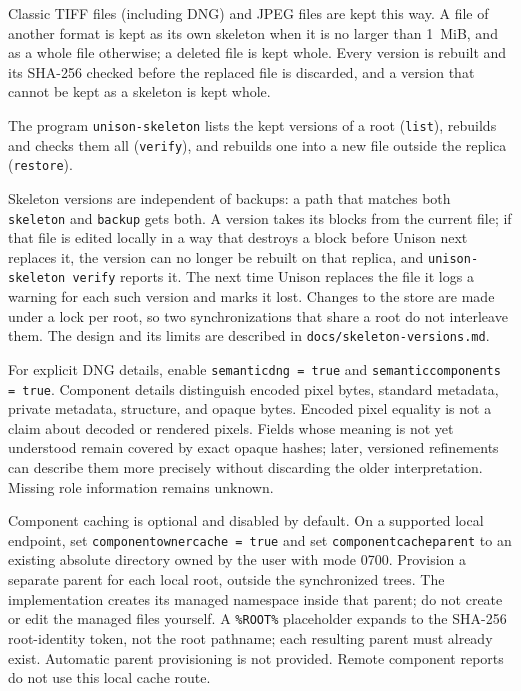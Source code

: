 \documentclass{article}
\begin{document}
Classic TIFF files (including DNG) and JPEG files are kept this way.  A file
of another format is kept as its own skeleton when it is no larger than
1~MiB, and as a whole file otherwise; a deleted file is kept whole.  Every
version is rebuilt and its SHA-256 checked before the replaced file is
discarded, and a version that cannot be kept as a skeleton is kept whole.

The program \verb|unison-skeleton| lists the kept versions of a root
(\verb|list|), rebuilds and checks them all (\verb|verify|), and rebuilds one
into a new file outside the replica (\verb|restore|).

Skeleton versions are independent of backups: a path that matches both
\verb|skeleton| and \verb|backup| gets both.  A version takes its blocks from
the current file; if that file is edited locally in a way that destroys a
block before Unison next replaces it, the version can no longer be rebuilt on
that replica, and \verb|unison-skeleton verify| reports it.  The next time
Unison replaces the file it logs a warning for each such version and marks it
lost.  Changes to the store are made under a lock per root, so two
synchronizations that share a root do not interleave them.  The design and
its limits are described in \verb|docs/skeleton-versions.md|.



For explicit DNG details, enable \verb|semanticdng = true| and
\verb|semanticcomponents = true|. Component details distinguish encoded pixel
bytes, standard metadata, private metadata, structure, and opaque bytes. Encoded
pixel equality is not a claim about decoded or rendered pixels. Fields whose
meaning is not yet understood remain covered by exact opaque hashes; later,
versioned refinements can describe them more precisely without discarding the
older interpretation. Missing role information remains unknown.

Component caching is optional and disabled by default. On a supported local
endpoint, set \verb|componentownercache = true| and set
\verb|componentcacheparent| to an existing absolute directory owned by the user
with mode 0700. Provision a separate parent for each local root, outside the
synchronized trees. The implementation creates its managed namespace inside
that parent; do not create or edit the managed files yourself. A
\verb|%ROOT%| placeholder expands to the SHA-256 root-identity token, not the
root pathname; each resulting parent must already exist. Automatic parent
provisioning is not provided. Remote component reports do not use this local
cache route.
\end{document}
